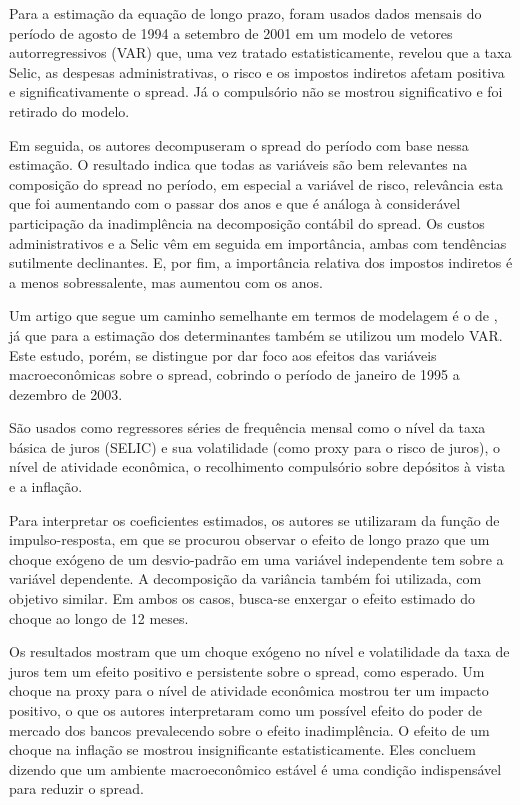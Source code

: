 \documentclass[a4paper,
               article,
               12pt,
               openany,
               oneside,
               english,
               brazil]{abntex2}
\numberwithin{equation}{section}
\begin{document}
    Para a estimação da equação de longo prazo, foram usados dados mensais do período de agosto de 1994 a setembro de 2001 em um modelo de vetores autorregressivos (VAR) que, uma vez tratado estatisticamente, revelou que a taxa Selic, as despesas administrativas, o risco e os impostos indiretos afetam positiva e significativamente o spread. Já o compulsório não se mostrou significativo e foi retirado do modelo.

    Em seguida, os autores decompuseram o spread do período com base nessa estimação. O resultado indica que todas as variáveis são bem relevantes na composição do spread no período, em especial a variável de risco, relevância esta que foi aumentando com o passar dos anos e que é análoga à considerável participação da inadimplência na decomposição contábil do spread. Os custos administrativos e a Selic vêm em seguida em importância, ambas com tendências sutilmente declinantes. E, por fim, a importância relativa dos impostos indiretos é a menos sobressalente, mas aumentou com os anos. 

    Um artigo que segue um caminho semelhante em termos de modelagem é o de \textcite{oreiro}, já que para a estimação dos determinantes também se utilizou um modelo VAR\@. Este estudo, porém, se distingue por dar foco aos efeitos das variáveis macroeconômicas sobre o spread, cobrindo o período de janeiro de 1995 a dezembro de 2003. 
    
    São usados como regressores séries de frequência mensal como o nível da taxa básica de juros (SELIC) e sua volatilidade (como proxy para o risco de juros), o nível de atividade econômica, o recolhimento compulsório sobre depósitos à vista e a inflação.

    Para interpretar os coeficientes estimados, os autores se utilizaram da função de impulso-resposta, em que se procurou observar o efeito de longo prazo que um choque exógeno de um desvio-padrão em uma variável independente tem sobre a variável dependente. A decomposição da variância também foi utilizada, com objetivo similar. Em ambos os casos, busca-se enxergar o efeito estimado do choque ao longo de 12 meses.

    Os resultados mostram que um choque exógeno no nível e volatilidade da taxa de juros tem um efeito positivo e persistente sobre o spread, como esperado. Um choque na proxy para o nível de atividade econômica mostrou ter um impacto positivo, o que os autores interpretaram como um possível efeito do poder de mercado dos bancos prevalecendo sobre o efeito inadimplência. O efeito de um choque na inflação se mostrou insignificante estatisticamente. Eles concluem dizendo que um ambiente macroeconômico estável é uma condição indispensável para reduzir o spread.
\end{document}
